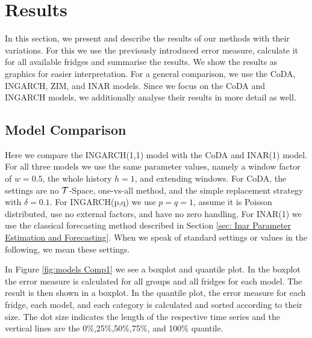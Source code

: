 \section{Results}
\label{sec:Results}

In this section, we present and describe the results of our methods with their variations. For this we use the previously introduced error measure, calculate it for all available fridges and summarise the results. We show the results as graphics for easier interpretation. For a general comparison, we use the CoDA, INGARCH, ZIM, and INAR models. Since we focus on the CoDA and INGARCH models, we additionally analyse their results in more detail as well. 

\subsection{Model Comparison}
\label{sec: Model Comparison}

Here we compare the INGARCH(1,1) model with the CoDA and INAR(1) model. For all three models we use the same parameter values, namely a window factor of $w=0.5$, the whole history $h=1$, and extending windows. For CoDA, the settings are no $\mathcal{T}$-Space, one-vs-all method, and the simple replacement strategy with $\delta=0.1$. For INGARCH(p,q) we use $p=q=1$, assume it is Poisson distributed, use no external factors, and have no zero handling. For INAR(1) we use the classical forecasting method described in Section \ref{sec: Inar Parameter Estimation and Forecasting}. When we speak of standard settings or values in the following, we mean these settings. 

In Figure \ref{fig:models Comp1} we see a boxplot and quantile plot. In the boxplot the error measure is calculated for all groups and all fridges for each model. The result is then shown in a boxplot. In the quantile plot, the error measure for each fridge, each model, and each category is calculated and sorted according to their size. The dot size indicates the length of the respective time series and the vertical lines are the 0\%,25\%,50\%,75\%, and 100\% quantile.

